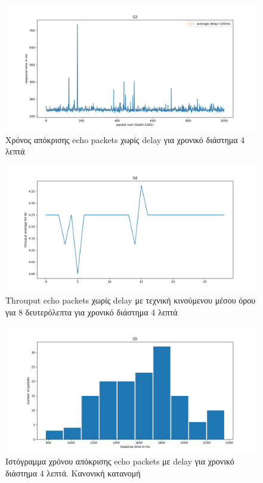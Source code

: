 \documentclass{article}
\begin{document}
\begin{figure}[H]
  \begin{center}
    \includegraphics[width=\textwidth]{G3.png}
  \end{center}
  \caption{Χρόνος απόκρισης echo packets χωρίς delay για χρονικό διάστημα 4 λεπτά}
\end{figure}

\begin{figure}[H]
  \begin{center}
    \includegraphics[width=\textwidth]{G4.png}
  \end{center}
  \caption{Throuput echo packets χωρίς delay με τεχνική κινούμενου μέσου όρου για 8
  δευτερόλεπτα για χρονικό διάστημα 4 λεπτά}
\end{figure}

\begin{figure}[H]
  \begin{center}
    \includegraphics[width=\textwidth]{G5.png}
  \end{center}
  \caption{Ιστόγραμμα χρόνου απόκρισης echo packets με delay για χρονικό διάστημα 4 λεπτά.
  Κανονική κατανομή}
\end{figure}
\end{document}
